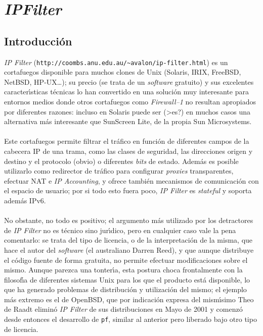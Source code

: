 \section{\it IPFilter}
\subsection{Introducci\'on}
{\it IP Filter} ({\tt http://coombs.anu.edu.au/\~{}avalon/ip-filter.html}) es 
un cortafuegos disponible para muchos clones de Unix (Solaris, IRIX, FreeBSD, 
NetBSD, HP-UX\ldots); su precio (se trata de un {\it software} gratuito) y sus
excelentes caracter\'{\i}sticas t\'ecnicas lo
han convertido en una soluci\'on muy interesante para entornos medios donde 
otros cortafuegos como {\it Firewall--1} no resultan apropiados por diferentes 
razones: incluso en Solaris puede ser (>es?) en muchos casos una alternativa 
m\'as interesante que SunScreen Lite, de la propia Sun Microsystems.\\
\\Este cortafuegos permite filtrar el tr\'afico en funci\'on de diferentes
campos de la cabecera IP de una trama, como las clases de seguridad, las 
direcciones origen y destino y el protocolo (obvio) o diferentes {\it bits} de
estado. Adem\'as es posible utilizarlo como redirector de tr\'afico para 
configurar {\it proxies} transparentes, efectuar NAT e {\it IP Accounting}, y 
ofrece tambi\'en mecanismos de comunicaci\'on con el espacio de usuario; por si
todo esto fuera poco, {\it IP Filter} es {\it stateful} y soporta adem\'as 
IPv6.\\
\\No obstante, no todo es positivo; el argumento m\'as utilizado por los 
detractores de {\it IP Filter} no es t\'ecnico sino jur\'{\i}dico, pero en 
cualquier caso vale la pena comentarlo: se trata del tipo de licencia, o de la
interpretaci\'on de la misma, que hace el autor del {\it software} (el 
australiano Darren Reed), y que aunque distribuye el c\'odigo fuente de forma
gratuita, no permite efectuar modificaciones sobre el mismo. Aunque parezca una
tonter\'{\i}a, esta postura choca frontalmente con la filosof\'{\i}a de 
diferentes sistemas Unix para los que el producto est\'a disponible, lo que
ha generado problemas de distribuci\'on y utilizaci\'on del mismo; el ejemplo
m\'as extremo es el de OpenBSD, que por indicaci\'on expresa del mism\'{\i}simo 
Theo de Raadt elimin\'o {\it IP Filter} de sus distribuciones en Mayo de 2001 y 
comenz\'o desde entonces el desarrollo de {\tt pf}, similar al anterior pero 
liberado bajo otro tipo de licencia.
